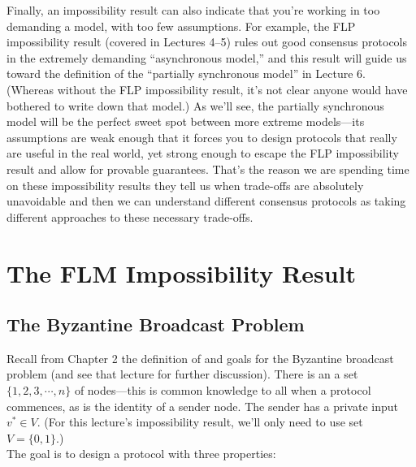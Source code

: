 Finally, an impossibility result can also indicate that you’re working in too demanding
a model, with too few assumptions. For example, the FLP impossibility result (covered in
Lectures 4–5) rules out good consensus protocols in the extremely demanding “asynchronous model,” and this result will guide us toward the definition of the “partially synchronous model” in Lecture 6. (Whereas without the FLP impossibility result, it’s not clear anyone
would have bothered to write down that model.) As we’ll see, the partially synchronous
model will be the perfect sweet spot between more extreme models—its assumptions are
weak enough that it forces you to design protocols that really are useful in the real world,
yet strong enough to escape the FLP impossibility result and allow for provable guarantees. That's the
reason we are spending time on these
impossibility results they
tell us when trade-offs are absolutely
unavoidable and then we can understand
different consensus protocols as taking
different approaches to these necessary
trade-offs.



\section{The FLM Impossibility Result}
\subsection{The Byzantine Broadcast Problem}
Recall from Chapter 2 the definition of and goals for the Byzantine broadcast problem (and
see that lecture for further discussion). There is an a set $\{1, 2, 3, \cdots, n\}$ of nodes—this is
common knowledge to all when a protocol commences, as is the identity of a sender node.
The sender has a private input $v^* \in V$. (For this lecture’s impossibility result, we’ll only
need to use set $V = \{0, 1\}$.)\\
The goal is to design a protocol with three properties:\\

